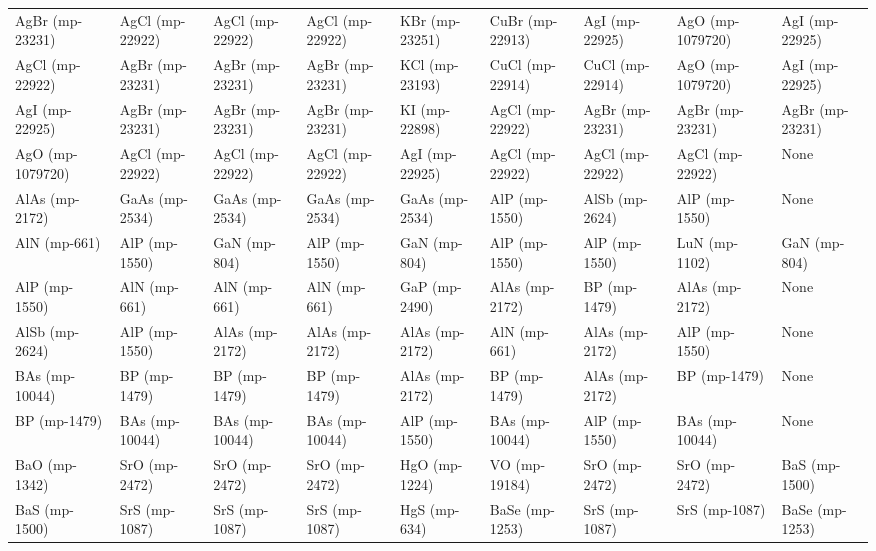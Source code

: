 \begin{longtable}{lllllllll}
\bottomrule
\endlastfoot
  AgBr (mp-23231) &   AgCl (mp-22922) &     AgCl (mp-22922) &   AgCl (mp-22922) &      KBr (mp-23251) &   CuBr (mp-22913) &    AgI (mp-22925) &  AgO (mp-1079720) &    AgI (mp-22925) \\
  AgCl (mp-22922) &   AgBr (mp-23231) &     AgBr (mp-23231) &   AgBr (mp-23231) &      KCl (mp-23193) &   CuCl (mp-22914) &   CuCl (mp-22914) &  AgO (mp-1079720) &    AgI (mp-22925) \\
   AgI (mp-22925) &   AgBr (mp-23231) &     AgBr (mp-23231) &   AgBr (mp-23231) &       KI (mp-22898) &   AgCl (mp-22922) &   AgBr (mp-23231) &   AgBr (mp-23231) &   AgBr (mp-23231) \\
 AgO (mp-1079720) &   AgCl (mp-22922) &     AgCl (mp-22922) &   AgCl (mp-22922) &      AgI (mp-22925) &   AgCl (mp-22922) &   AgCl (mp-22922) &   AgCl (mp-22922) &              None \\
   AlAs (mp-2172) &    GaAs (mp-2534) &      GaAs (mp-2534) &    GaAs (mp-2534) &      GaAs (mp-2534) &     AlP (mp-1550) &    AlSb (mp-2624) &     AlP (mp-1550) &              None \\
     AlN (mp-661) &     AlP (mp-1550) &        GaN (mp-804) &     AlP (mp-1550) &        GaN (mp-804) &     AlP (mp-1550) &     AlP (mp-1550) &     LuN (mp-1102) &      GaN (mp-804) \\
    AlP (mp-1550) &      AlN (mp-661) &        AlN (mp-661) &      AlN (mp-661) &       GaP (mp-2490) &    AlAs (mp-2172) &      BP (mp-1479) &    AlAs (mp-2172) &              None \\
   AlSb (mp-2624) &     AlP (mp-1550) &      AlAs (mp-2172) &    AlAs (mp-2172) &      AlAs (mp-2172) &      AlN (mp-661) &    AlAs (mp-2172) &     AlP (mp-1550) &              None \\
   BAs (mp-10044) &      BP (mp-1479) &        BP (mp-1479) &      BP (mp-1479) &      AlAs (mp-2172) &      BP (mp-1479) &    AlAs (mp-2172) &      BP (mp-1479) &              None \\
     BP (mp-1479) &    BAs (mp-10044) &      BAs (mp-10044) &    BAs (mp-10044) &       AlP (mp-1550) &    BAs (mp-10044) &     AlP (mp-1550) &    BAs (mp-10044) &              None \\
    BaO (mp-1342) &     SrO (mp-2472) &       SrO (mp-2472) &     SrO (mp-2472) &       HgO (mp-1224) &     VO (mp-19184) &     SrO (mp-2472) &     SrO (mp-2472) &     BaS (mp-1500) \\
    BaS (mp-1500) &     SrS (mp-1087) &       SrS (mp-1087) &     SrS (mp-1087) &        HgS (mp-634) &    BaSe (mp-1253) &     SrS (mp-1087) &     SrS (mp-1087) &    BaSe (mp-1253) \\

\end{longtable}

